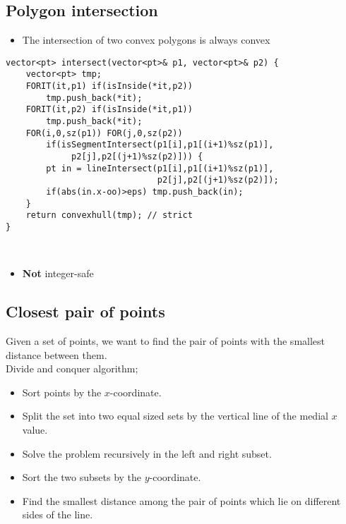 \documentclass[12pt,t]{beamer}
\newcommand{\bi}{\begin{itemize}}
\newcommand{\ei}{\end{itemize}}
\begin{document}
\subsection{Polygon intersection}
\begin{frame}
  \vspace{40pt}
  \bi
    \item The intersection of two convex polygons is always convex
  \ei
\end{frame}


\begin{frame}[fragile]
  \scriptsize
  \begin{verbatim}
vector<pt> intersect(vector<pt>& p1, vector<pt>& p2) {
    vector<pt> tmp;
    FORIT(it,p1) if(isInside(*it,p2))
        tmp.push_back(*it);
    FORIT(it,p2) if(isInside(*it,p1))
        tmp.push_back(*it);
    FOR(i,0,sz(p1)) FOR(j,0,sz(p2))
        if(isSegmentIntersect(p1[i],p1[(i+1)%sz(p1)],
             p2[j],p2[(j+1)%sz(p2)])) {
        pt in = lineIntersect(p1[i],p1[(i+1)%sz(p1)],
                              p2[j],p2[(j+1)%sz(p2)]);
        if(abs(in.x-oo)>eps) tmp.push_back(in);
    }
    return convexhull(tmp); // strict
}
  \end{verbatim}
  \ \\ \pause \normalsize
  \bi
  	\item \textbf{Not} integer-safe
  \ei
\end{frame}



\subsection{Closest pair of points}
\begin{frame}
  \vspace{20pt}
  Given a set of points, we want to find the pair of points with the smallest distance between them. \\
  \vspace{5pt}
  Divide and conquer algorithm;
  \bi
    \item Sort points by the $x$-coordinate.
    \item Split the set into two equal sized sets by the vertical line of the medial $x$ value.
    \item Solve the problem recursively in the left and right subset.
    \item Sort the two subsets by the $y$-coordinate.
    \item Find the smallest distance among the pair of points which lie on different sides of the line.
  \ei
\end{frame}
\end{document}
